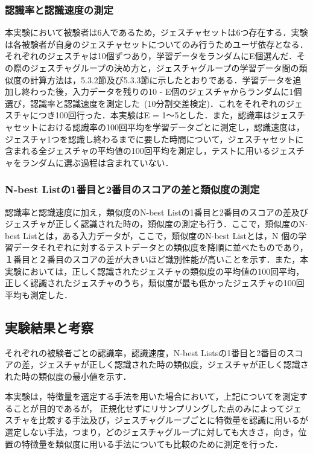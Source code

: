 \subsubsection{認識率と認識速度の測定}
本実験において被験者は6人であるため，ジェスチャセットは6つ存在する．実験は各被験者が自身のジェスチャセットについてのみ行うためユーザ依存となる．それぞれのジェスチャは10個ずつあり，学習データをランダムにE個選んだ．その際のジェスチャグループの決め方と，ジェスチャグループの学習データ間の類似度の計算方法は，5.3.2節及び5.3.3節に示したとおりである．学習データを追加し終わった後，入力データを残りの10 - E個のジェスチャからランダムに1個選び，認識率と認識速度を測定した~(10分割交差検定)．これをそれぞれのジェスチャにつき100回行った．本実験はE = 1〜5とした．また，認識率はジェスチャセットにおける認識率の100回平均を学習データごとに測定し，認識速度は，ジェスチャ1つを認識し終わるまでに要した時間について，ジェスチャセットに含まれる全ジェスチャの平均値の100回平均を測定し，テストに用いるジェスチャをランダムに選ぶ過程は含まれていない．

\subsubsection{N-best Listの1番目と2番目のスコアの差と類似度の測定}
認識率と認識速度に加え，類似度のN-best Listの1番目と2番目のスコアの差及びジェスチャが正しく認識された時の，類似度の測定も行う．ここで，類似度のN-best Listとは，ある入力データが，ここで，類似度のN-best Listとは，N 個の学習データそれぞれに対するテストデータとの類似度を降順に並べたものであり，１番目と２番目のスコアの差が大きいほど識別性能が高いことを示す．また，本実験においては，正しく認識されたジェスチャの類似度の平均値の100回平均，正しく認識されたジェスチャのうち，類似度が最も低かったジェスチャの100回平均も測定した．


\subsection{実験結果と考察}
それぞれの被験者ごとの認識率，認識速度，N-best Listsの1番目と2番目のスコアの差，ジェスチャが正しく認識された時の類似度，ジェスチャが正しく認識された時の類似度の最小値を示す．

本実験は，特徴量を選定する手法を用いた場合において，上記についてを測定することが目的であるが，
正規化せずにリサンプリングした点のみによってジェスチャを比較する手法及び，ジェスチャグループごとに特徴量を認識に用いるが選定しない手法，つまり，どのジェスチャグループに対しても大きさ，向き，位置の特徴量を類似度に用いる手法についても比較のために測定を行った．

